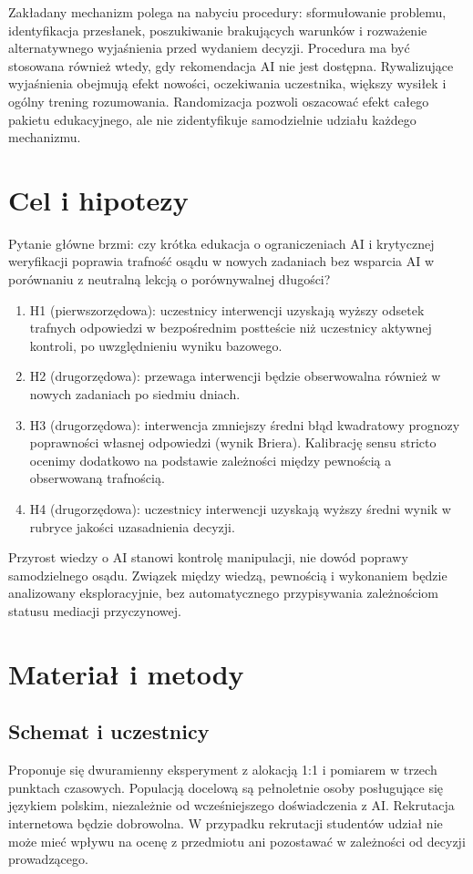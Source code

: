 \documentclass[11pt,a4paper]{article}
\begin{document}
Zakładany mechanizm polega na nabyciu procedury: sformułowanie problemu, identyfikacja przesłanek, poszukiwanie brakujących warunków i rozważenie alternatywnego wyjaśnienia przed wydaniem decyzji. Procedura ma być stosowana również wtedy, gdy rekomendacja AI nie jest dostępna. Rywalizujące wyjaśnienia obejmują efekt nowości, oczekiwania uczestnika, większy wysiłek i ogólny trening rozumowania. Randomizacja pozwoli oszacować efekt całego pakietu edukacyjnego, ale nie zidentyfikuje samodzielnie udziału każdego mechanizmu.

\section{Cel i hipotezy}
Pytanie główne brzmi: czy krótka edukacja o ograniczeniach AI i krytycznej weryfikacji poprawia trafność osądu w nowych zadaniach bez wsparcia AI w porównaniu z neutralną lekcją o porównywalnej długości?

\begin{enumerate}
\item H1 (pierwszorzędowa): uczestnicy interwencji uzyskają wyższy odsetek trafnych odpowiedzi w bezpośrednim postteście niż uczestnicy aktywnej kontroli, po uwzględnieniu wyniku bazowego.
\item H2 (drugorzędowa): przewaga interwencji będzie obserwowalna również w nowych zadaniach po siedmiu dniach.
\item H3 (drugorzędowa): interwencja zmniejszy średni błąd kwadratowy prognozy poprawności własnej odpowiedzi (wynik Briera). Kalibrację sensu stricto ocenimy dodatkowo na podstawie zależności między pewnością a obserwowaną trafnością.
\item H4 (drugorzędowa): uczestnicy interwencji uzyskają wyższy średni wynik w rubryce jakości uzasadnienia decyzji.
\end{enumerate}

Przyrost wiedzy o AI stanowi kontrolę manipulacji, nie dowód poprawy samodzielnego osądu. Związek między wiedzą, pewnością i wykonaniem będzie analizowany eksploracyjnie, bez automatycznego przypisywania zależnościom statusu mediacji przyczynowej.

\section{Materiał i metody}
\subsection{Schemat i uczestnicy}
Proponuje się dwuramienny eksperyment z alokacją 1:1 i pomiarem w trzech punktach czasowych. Populacją docelową są pełnoletnie osoby posługujące się językiem polskim, niezależnie od wcześniejszego doświadczenia z AI. Rekrutacja internetowa będzie dobrowolna. W przypadku rekrutacji studentów udział nie może mieć wpływu na ocenę z przedmiotu ani pozostawać w zależności od decyzji prowadzącego.
\end{document}
